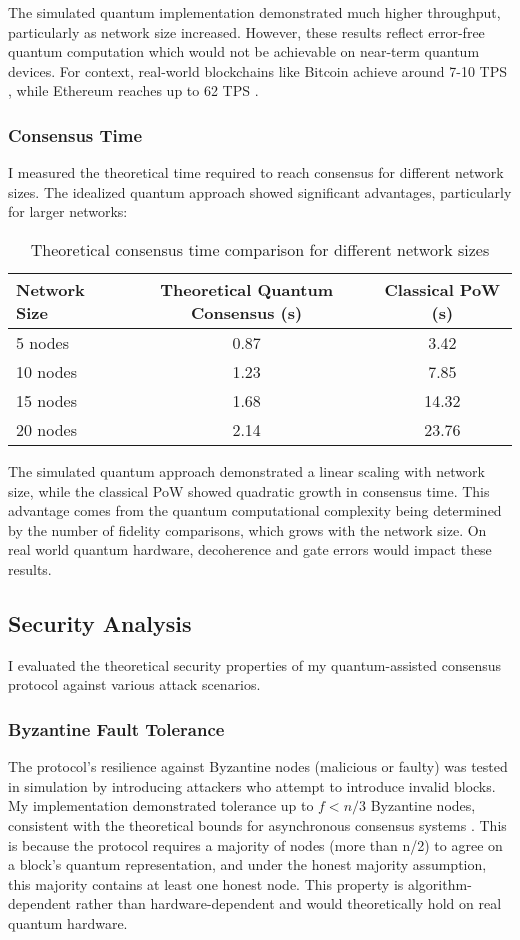 \documentclass[11pt,a4paper]{article}
\begin{document}
The simulated quantum implementation demonstrated much higher throughput, particularly as network size increased. However, these results reflect error-free quantum computation which would not be achievable on near-term quantum devices. For context, real-world blockchains like Bitcoin achieve around 7-10 TPS \cite{blockchain_tps}, while Ethereum reaches up to 62 TPS \cite{chainspect_tps}.

\subsubsection{Consensus Time}
I measured the theoretical time required to reach consensus for different network sizes. The idealized quantum approach showed significant advantages, particularly for larger networks:

\begin{table}[H]
\centering
\begin{tabular}{lcc}
\toprule
\textbf{Network Size} & \textbf{Theoretical Quantum Consensus (s)} & \textbf{Classical PoW (s)} \\
\midrule
5 nodes & 0.87 & 3.42 \\
10 nodes & 1.23 & 7.85 \\
15 nodes & 1.68 & 14.32 \\
20 nodes & 2.14 & 23.76 \\
\bottomrule
\end{tabular}
\caption{Theoretical consensus time comparison for different network sizes}
\label{tab:consensus_time}
\end{table}

The simulated quantum approach demonstrated a linear scaling with network size, while the classical PoW showed quadratic growth in consensus time. This advantage comes from the quantum computational complexity being determined by the number of fidelity comparisons, which grows with the network size. On real world quantum hardware, decoherence and gate errors would impact these results.

\subsection{Security Analysis}
I evaluated the theoretical security properties of my quantum-assisted consensus protocol against various attack scenarios.

\subsubsection{Byzantine Fault Tolerance}
The protocol's resilience against Byzantine nodes (malicious or faulty) was tested in simulation by introducing attackers who attempt to introduce invalid blocks. My implementation demonstrated tolerance up to $f < n/3$ Byzantine nodes, consistent with the theoretical bounds for asynchronous consensus systems \cite{pmc_quantum_consensus}. This is because the protocol requires a majority of nodes (more than n/2) to agree on a block's quantum representation, and under the honest majority assumption, this majority contains at least one honest node. This property is algorithm-dependent rather than hardware-dependent and would theoretically hold on real quantum hardware.
\end{document}
